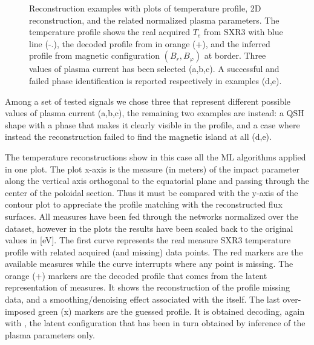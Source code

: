 \begin{figure}

\caption{Reconstruction examples with plots of temperature profile, 2D reconstruction, and the related normalized plasma parameters. The temperature profile shows the real acquired $T_e$ from SXR3 with blue line (-.), the decoded profile from  in orange (+), and the inferred profile from magnetic configuration $(B_r, B_\varphi)$ at border. Three values of plasma current has been selected (a,b,c). A successful and failed phase identification is reported respectively in examples (d,e). }
\label{fig:Step_12_val}
\end{figure}
%
Among a set of tested signals we chose three that represent different possible values of plasma current \Figure{\ref{fig:Step_12_val}}(a,b,c), the remaining two examples are instead: a QSH shape with a phase that makes it clearly visible in the profile, and a case where instead the reconstruction failed to find the magnetic island at all \Figure{\ref{fig:Step_12_val}}(d,e).

The temperature reconstructions show in this case all the ML algorithms applied in one plot. The plot x-axis is the measure (in meters) of the impact parameter along the vertical axis orthogonal to the equatorial plane and passing through the center of the poloidal section. Thus it must be compared with the y-axis of the contour plot to appreciate the profile matching with the reconstructed flux surfaces. All measures have been fed through the networks normalized over the dataset, however in the plots the results have been scaled back to the original values in [eV].
The first curve represents the real measure SXR3 temperature profile with related acquired (and missing) data points.
The red markers are the available measures while the curve interrupts where any point is missing.
The orange (+) markers are the decoded profile that comes from the  latent representation of measures. It shows the reconstruction of the profile missing data, and a smoothing/denoising effect associated with the  itself.
The last over-imposed green (x) markers are the guessed profile. It is obtained decoding, again with , the latent configuration that has been in turn obtained by inference of the plasma parameters only.

